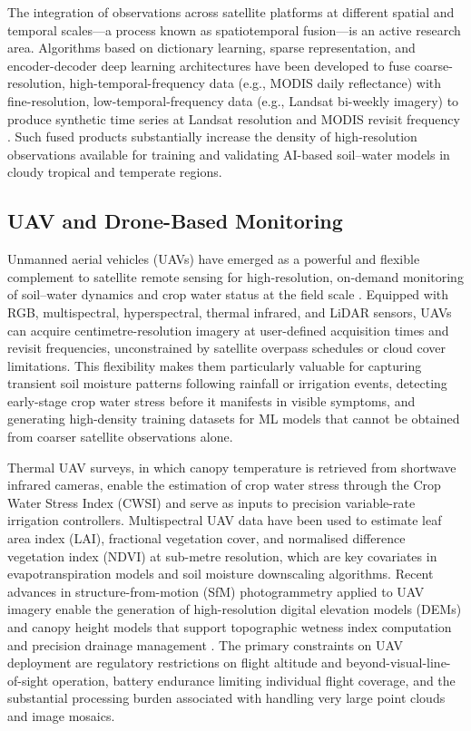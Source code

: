 \documentclass[land,article,submit,pdftex,moreauthors]{Definitions/mdpi}
\numberwithin{equation}{section}
\begin{document}
The integration of observations across satellite platforms at different spatial and temporal scales---a process known as spatiotemporal fusion---is an active research area. Algorithms based on dictionary learning, sparse representation, and encoder-decoder deep learning architectures have been developed to fuse coarse-resolution, high-temporal-frequency data (e.g., MODIS daily reflectance) with fine-resolution, low-temporal-frequency data (e.g., Landsat bi-weekly imagery) to produce synthetic time series at Landsat resolution and MODIS revisit frequency \citep{gao2017blending}. Such fused products substantially increase the density of high-resolution observations available for training and validating AI-based soil--water models in cloudy tropical and temperate regions.

\subsection{UAV and Drone-Based Monitoring}

Unmanned aerial vehicles (UAVs) have emerged as a powerful and flexible complement to satellite remote sensing for high-resolution, on-demand monitoring of soil--water dynamics and crop water status at the field scale \citep{mulla2013twenty}. Equipped with RGB, multispectral, hyperspectral, thermal infrared, and LiDAR sensors, UAVs can acquire centimetre-resolution imagery at user-defined acquisition times and revisit frequencies, unconstrained by satellite overpass schedules or cloud cover limitations. This flexibility makes them particularly valuable for capturing transient soil moisture patterns following rainfall or irrigation events, detecting early-stage crop water stress before it manifests in visible symptoms, and generating high-density training datasets for ML models that cannot be obtained from coarser satellite observations alone.

Thermal UAV surveys, in which canopy temperature is retrieved from shortwave infrared cameras, enable the estimation of crop water stress through the Crop Water Stress Index (CWSI) \citep{jones2004use} and serve as inputs to precision variable-rate irrigation controllers. Multispectral UAV data have been used to estimate leaf area index (LAI), fractional vegetation cover, and normalised difference vegetation index (NDVI) at sub-metre resolution, which are key covariates in evapotranspiration models and soil moisture downscaling algorithms. Recent advances in structure-from-motion (SfM) photogrammetry applied to UAV imagery enable the generation of high-resolution digital elevation models (DEMs) and canopy height models that support topographic wetness index computation and precision drainage management \citep{yao2019uav}. The primary constraints on UAV deployment are regulatory restrictions on flight altitude and beyond-visual-line-of-sight operation, battery endurance limiting individual flight coverage, and the substantial processing burden associated with handling very large point clouds and image mosaics.
\end{document}
